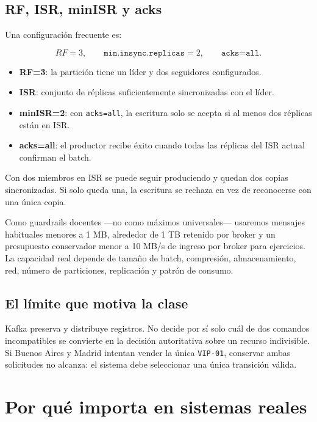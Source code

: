 \documentclass[variant=apuntes,cover=institutional,mode=screen]{ua-engineering-v6-article}
\begin{document}
\subsection{RF, ISR, minISR y acks}

Una configuración frecuente es:

\[
RF=3,\qquad \texttt{min.insync.replicas}=2,\qquad \texttt{acks=all}.
\]

\begin{itemize}
\item \textbf{RF=3}: la partición tiene un líder y dos seguidores configurados.
\item \textbf{ISR}: conjunto de réplicas suficientemente sincronizadas con el líder.
\item \textbf{minISR=2}: con \texttt{acks=all}, la escritura solo se acepta si al menos dos réplicas están en ISR.
\item \textbf{acks=all}: el productor recibe éxito cuando todas las réplicas del ISR actual confirman el batch.
\end{itemize}

Con dos miembros en ISR se puede seguir produciendo y quedan dos copias sincronizadas. Si solo queda una, la escritura se rechaza en vez de reconocerse con una única copia.

Como guardrails docentes ---no como máximos universales--- usaremos mensajes habituales menores a 1 MB, alrededor de 1 TB retenido por broker y un presupuesto conservador menor a 10 MB/s de ingreso por broker para ejercicios. La capacidad real depende de tamaño de batch, compresión, almacenamiento, red, número de particiones, replicación y patrón de consumo.

\subsection{El límite que motiva la clase}

Kafka preserva y distribuye registros. No decide por sí solo cuál de dos comandos incompatibles se convierte en la decisión autoritativa sobre un recurso indivisible. Si Buenos Aires y Madrid intentan vender la única \texttt{VIP-01}, conservar ambas solicitudes no alcanza: el sistema debe seleccionar una única transición válida.

\section{Por qué importa en sistemas reales}
\end{document}
